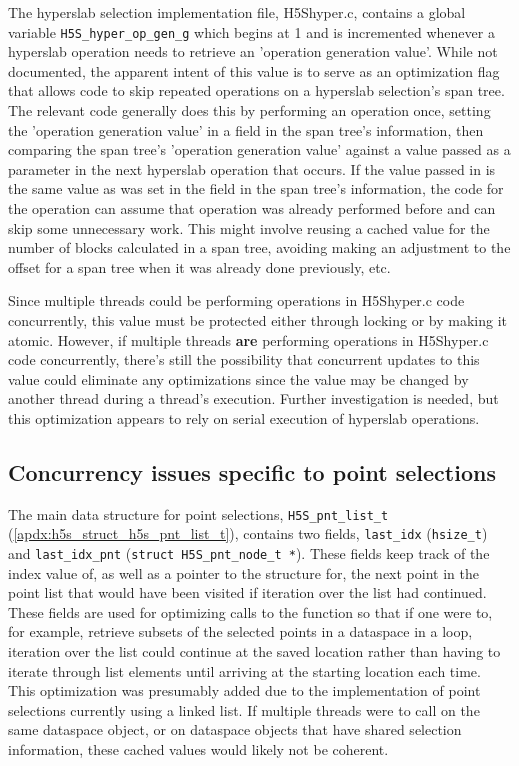 \documentclass[../HDF5_RFC.tex]{subfiles}
\begin{document}
The hyperslab selection implementation file, H5Shyper.c, contains a global variable
\texttt{H5S\_hyper\_op\_gen\_g} which begins at 1 and is incremented whenever a hyperslab
operation needs to retrieve an 'operation generation value'. While not documented, the
apparent intent of this value is to serve as an optimization flag that allows code to
skip repeated operations on a hyperslab selection's span tree. The relevant code generally
does this by performing an operation once, setting the 'operation generation value' in 
a field in the span tree's information, then comparing the span tree's 'operation generation
value' against a value passed as a parameter in the next hyperslab operation that occurs.
If the value passed in is the same value as was set in the field in the span tree's
information, the code for the operation can assume that operation was already performed
before and can skip some unnecessary work. This might involve reusing a cached value for
the number of blocks calculated in a span tree, avoiding making an adjustment to the offset
for a span tree when it was already done previously, etc.

Since multiple threads could be performing operations in H5Shyper.c code concurrently, this
value must be protected either through locking or by making it atomic. However, if multiple
threads \textbf{are} performing operations in H5Shyper.c code concurrently, there's still
the possibility that concurrent updates to this value could eliminate any optimizations
since the value may be changed by another thread during a thread's execution. Further
investigation is needed, but this optimization appears to rely on serial execution of
hyperslab operations.

\subsection{Concurrency issues specific to point selections}
\label{h5s_concurrency_point}

The main data structure for point selections, \texttt{H5S\_pnt\_list\_t}
(\ref{apdx:h5s_struct_h5s_pnt_list_t}), contains two fields, \texttt{last\_idx} (\texttt{hsize\_t})
and \texttt{last\_idx\_pnt} (\texttt{struct H5S\_pnt\_node\_t *}). These fields keep track of the
index value of, as well as a pointer to the structure for, the next point in the point list that
would have been visited if iteration over the list had continued. These fields are used for
optimizing calls to the  function so that if
one were to, for example, retrieve subsets of the selected points in a dataspace in a loop,
iteration over the list could continue at the saved location rather than having to iterate through
list elements until arriving at the starting location each time. This optimization was presumably
added due to the implementation of point selections currently using a linked list. If multiple
threads were to call  on the same dataspace
object, or on dataspace objects that have shared selection information, these cached values would
likely not be coherent.
\end{document}
